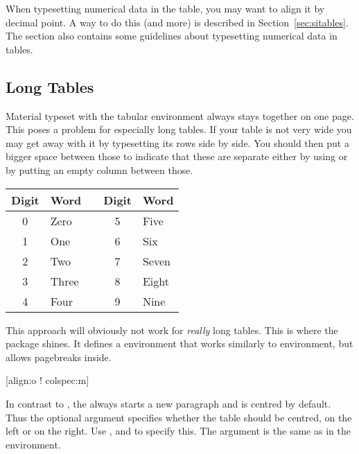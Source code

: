 When typesetting numerical data in the table, you may want to align it by
decimal point. A way to do this (and more) is described in
Section~\ref{sec:sitables}. The section also contains some guidelines about
typesetting numerical data in tables.

\subsection{Long Tables}

Material typeset with the tabular environment always stays together on one
page. This poses a problem for especially long tables. If your table is not
very wide you may get away with it by typesetting its rows side by side. You
should then put a bigger space between those to indicate that these are
separate either by using  or by putting an empty column between
those.
\begin{example}[examplewidth=0.4\linewidth]
\begin{tabular}{@{}cllcl@{}}
  \toprule
  Digit & Word  && Digit & Word  \\
  \midrule
  0     & Zero  && 5     & Five  \\
  1     & One   && 6     & Six   \\
  2     & Two   && 7     & Seven \\
  3     & Three && 8     & Eight \\
  4     & Four  && 9     & Nine  \\
  \bottomrule
\end{tabular}
\end{example}

This approach will obviously not work for \emph{really} long tables. This is
where the  package shines. It defines a 
environment that works similarly to  environment, but allows
pagebreaks inside.

\begin{lscommand}
  [align:o ! colspec:m]
\end{lscommand}
In contrast to , the  always starts a new paragraph
and is centred by default. Thus the optional argument  specifies
whether the table should be centred, on the left or on the right. Use
,  and  to specify this. The  argument
is the same as in the  environment.

